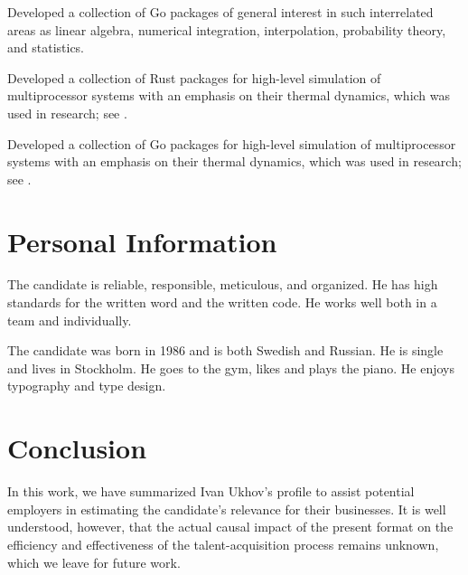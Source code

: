 \documentclass[journal]{IEEEtran}
\begin{document}
\emph{} Developed a collection of Go packages of general interest in such
interrelated areas as linear algebra, numerical integration, interpolation,
probability theory, and statistics.

\emph{} Developed a collection of Rust packages for high-level simulation of
multiprocessor systems with an emphasis on their thermal dynamics, which was
used in research; see .

\emph{} Developed a collection of Go packages for
high-level simulation of multiprocessor systems with an emphasis on their
thermal dynamics, which was used in research; see .

\section{Personal Information} 

The candidate is reliable, responsible, meticulous, and organized. He has high
standards for the written word and the written code. He works well both in a
team and individually.

The candidate was born in 1986 and is both Swedish and Russian. He is single and
lives in Stockholm. He goes to the gym, likes
 and plays the
piano. He enjoys typography and type design.

\section{Conclusion} 

In this work, we have summarized Ivan Ukhov's profile to assist potential
employers in estimating the candidate's relevance for their businesses. It is
well understood, however, that the actual causal impact of the present format on
the efficiency and effectiveness of the talent-acquisition process remains
unknown, which we leave for future work.

\begingroup
  
  
\endgroup
\end{document}
